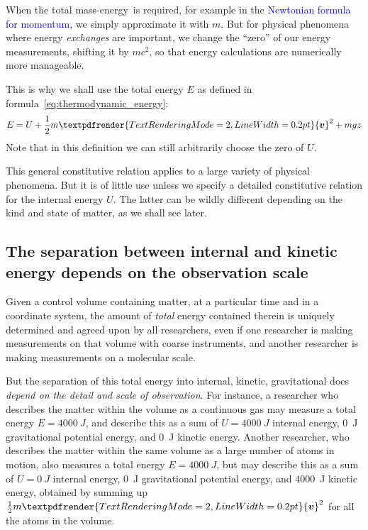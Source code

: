 \documentclass[a4paper,12pt,%
onecolumn,oneside,%
british%
]{memoir}
\renewcommand*{\bm}[1]{\textpdfrender{TextRenderingMode=2,LineWidth=0.2pt}{\boldsymbol{#1}}}
\renewcommand*{\|}[1][]{\nonscript\:#1\vert\nonscript\:\mathopen{}}
\newcommand*{\sect}{\S}%
\renewcommand*{\autoref}[2]{\sidepar{\vspace{-1ex}\footnotesize{\color{blue}\faIcon{%
angle-right%
}\enspace\sect~\ref{#1} page~\pageref{#1}}}\textcolor{blue}{#2}}
\newcommand*{\masse}{mass-energy}
\newcommand*{\yv}{\bm{v}}
\newcommand*{\yM}{m}%
\newcommand*{\yE}{E}
\newcommand*{\yU}{U}
\begin{document}
\medskip

When the total \masse\ is required, for example in the \autoref{eq:matter_momentum_Newton}{Newtonian formula for momentum}, we simply approximate it with $\yM$. But for physical phenomena where energy \emph{exchanges} are important, we change the \enquote{zero} of our energy measurements, shifting it by $\yM c^{2}$, so that energy calculations are numerically more manageable.

This is why we shall use the total energy $\yE$ as defined in formula~\eqref{eq:thermodynamic_energy}:
\begin{equation*}
  \yE = \yU + \frac{1}{2}\yM \yv^{2} + \yM g z
\end{equation*}
Note that in this definition we can still arbitrarily choose the zero of $\yU$.

\medskip

This general constitutive relation applies to a large variety of physical phenomena. But it is of little use unless we specify a detailed constitutive relation for the internal energy $\yU$. The latter can be wildly different depending on the kind and state of matter, as we shall see later.

\subsection{The separation between internal and kinetic energy depends on the observation scale}
\label{sec:dependence_energycontentdivision}

Given a control volume containing matter, at a particular time and in a coordinate system, the amount of \emph{total} energy contained therein is uniquely determined and agreed upon by all researchers, even if one researcher is making measurements on that volume with coarse instruments, and another researcher is making measurements on a molecular scale.

But the separation of this total energy into internal, kinetic, gravitational does \emph{depend on the detail and scale of observation}. For instance, a researcher who describes the matter within the volume as a continuous gas may measure a total energy $\yE=\qty{4000}{J}$, and describe this as a sum of $\yU=\qty{4000}{J}$ internal energy, \qty{0}{J} gravitational potential energy, and \qty{0}{J} kinetic energy. Another researcher, who describes the matter within the same volume as a large number of atoms in motion, also measures a total energy $\yE=\qty{4000}{J}$, but may describe this as a sum of $\yU=\qty{0}{J}$ internal energy, \qty{0}{J} gravitational potential energy, and \qty{4000}{J} kinetic energy, obtained by summing up $\tfrac12\yM\yv^{2}$ for all the atoms in the volume.
\end{document}
